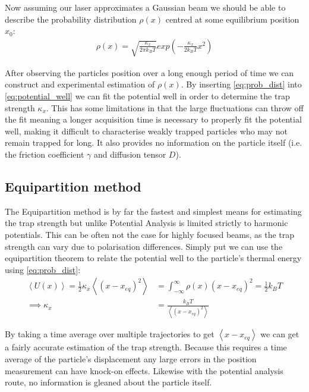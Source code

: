 Now assuming our laser approximates a Gaussian beam we 
should be able to describe the probability distribution 
$\rho(x)$ centred at some equilibrium position $x_0$:
\begin{align}
	\label{eq:prob_dist}
	\rho(x)= \sqrt{\frac{\kappa_x}{2\pi k_BT}} exp\left(-\frac{\kappa_x}{2k_BT}x^2\right)
\end{align}

After observing the particles position over a long enough
period of time we can construct and experimental estimation
of $\rho(x)$. By inserting \eqref{eq:prob_dist} into \eqref{eq:potential_well} we can fit the potential well in 
order to determine the trap strength $\kappa_x$. This has 
some limitations in that the large fluctuations can throw 
off the fit meaning a longer acquisition time is necessary 
to properly fit the potential well, making it difficult to 
characterise weakly trapped particles who may not remain 
trapped for long. It also provides no information on the 
particle itself (i.e. the friction coefficient $\gamma$ and 
diffusion tensor $D$).

\subsection{Equipartition method}
The Equipartition method is by far the fastest and simplest means 
for estimating the trap strength but unlike Potential Analysis is 
limited strictly to harmonic potentials. This can be often not the 
case for highly focused beams, as the trap strength can vary due to 
polarisation differences. Simply put we can use the equipartition 
theorem to relate the potential well to the particle's thermal 
energy using \eqref{eq:prob_dist}:
\begin{align}
	\left<U(x)\right> = \frac{1}{2}\kappa_x\left<(x-x_{eq})^2\right> &= \int_{-\infty}^{\infty}\rho(x)(x-x_{eq})^2 = \frac{1}{2}k_BT \\
	\implies \kappa_x &= \frac{k_BT}{\left<(x-x_{eq})^2\right>} 
\end{align}

By taking a time average over multiple trajectories to get 
$\left<x-x_{eq}\right>$ we can get a fairly accurate estimation 
of the trap strength. Because this requires a time average of 
the particle's displacement any large errors in the position 
measurement can have knock-on effects. Likewise with the potential 
analysis route, no information is gleaned about the particle itself.

